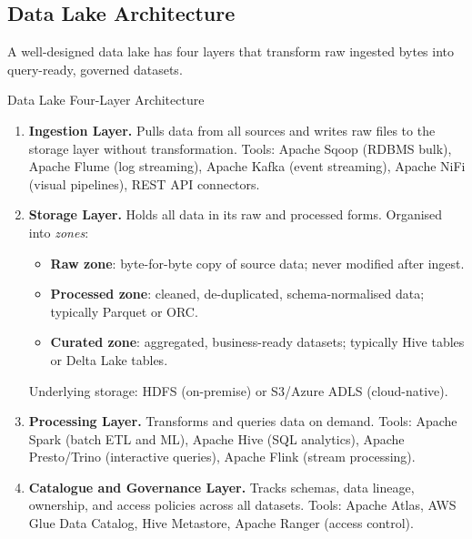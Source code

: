 \subsection{Data Lake Architecture}
\label{subsec:lake-architecture}

A well-designed data lake has four layers that transform raw ingested
bytes into query-ready, governed datasets.

\begin{defbox}{Data Lake Four-Layer Architecture}
\begin{enumerate}
  \item \textbf{Ingestion Layer.} Pulls data from all sources and
        writes raw files to the storage layer without transformation.
        Tools: Apache Sqoop (RDBMS bulk), Apache Flume (log streaming),
        Apache Kafka (event streaming), Apache NiFi (visual pipelines),
        REST API connectors.
  \item \textbf{Storage Layer.} Holds all data in its raw and processed
        forms. Organised into \emph{zones}:
        \begin{itemize}
          \item \textbf{Raw zone}: byte-for-byte copy of source data;
                never modified after ingest.
          \item \textbf{Processed zone}: cleaned, de-duplicated,
                schema-normalised data; typically Parquet or ORC.
          \item \textbf{Curated zone}: aggregated, business-ready
                datasets; typically Hive tables or Delta Lake tables.
        \end{itemize}
        Underlying storage: HDFS (on-premise) or S3/Azure ADLS
        (cloud-native).
  \item \textbf{Processing Layer.} Transforms and queries data on demand.
        Tools: Apache Spark (batch ETL and ML), Apache Hive (SQL
        analytics), Apache Presto/Trino (interactive queries), Apache Flink
        (stream processing).
  \item \textbf{Catalogue and Governance Layer.} Tracks schemas, data
        lineage, ownership, and access policies across all datasets.
        Tools: Apache Atlas, AWS Glue Data Catalog, Hive Metastore,
        Apache Ranger (access control).
\end{enumerate}
\end{defbox}


